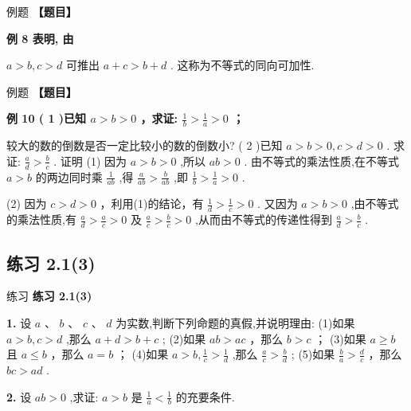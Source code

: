 \documentclass[a4paper,10pt,oneside,fontset=none]{ctexbook}
\renewcommand{\geq}{\geqslant}
\renewcommand{\leq}{\leqslant}
\newcounter{example}[chapter]
\newenvironment{example}[1][]{\begin{exBox}{例题}{#1}}{\end{exBox}}
\newenvironment{exercise}[1][]{\begin{exBox}{练习}{#1}}{\end{exBox}}
\numberwithin{equation}{chapter}
\begin{document}
\begin{example}
\textbf{【题目】}\par\vspace{0.3em}
\textbf{例 8 表明, 由}\par\vspace{0.3em}
$a > b, c > d$
可推出
$a + c > b + d$ .
这称为不等式的同向可加性.
\end{example}

\begin{example}
\textbf{【题目】}\par\vspace{0.3em}
\textbf{例 10 ( 1 )已知 $a > b > 0$ ，求证: $\frac{1}{b} > \frac{1}{a} > 0$ ；}\par\vspace{0.3em}
较大的数的倒数是否一定比较小的数的倒数小?
( 2 )已知 $a > b > 0, c > d > 0$ . 求证: $\frac{a}{d} > \frac{b}{c}$ .
证明 (1) 因为 $a > b > 0$ ,所以 ${ab} > 0$ .
由不等式的乘法性质,在不等式 $a > b$ 的两边同时乘 $\frac{1}{ab}$ ,得 $\frac{a}{ab} > \frac{b}{ab}$ ,即 $\frac{1}{b} > \frac{1}{a} > 0$ .
\par
(2) 因为 $c > d > 0$ ，利用(1)的结论，有 $\frac{1}{d} > \frac{1}{c} > 0$ .
又因为 $a > b > 0$ ,由不等式的乘法性质,有 $\frac{a}{d} > \frac{a}{c} > 0$ 及 $\frac{a}{c} > \frac{b}{c} > 0$ ,从而由不等式的传递性得到 $\frac{a}{d} > \frac{b}{c}$ .
\end{example}

\subsection*{练习 2.1(3)}

\begin{exercise}
\textbf{练习 2.1(3)}\par\vspace{0.5em}
\textbf{1.} 设 $a\text{ 、 }b\text{ 、 }c\text{ 、 }d$ 为实数,判断下列命题的真假,并说明理由: (1)如果 $a > b, c > d$ ,那么 $a + d > b + c$ ; (2)如果 ${ab} > {ac}$ ，那么 $b > c$ ； (3)如果 $a \geq  b$ 且 $a \leq  b$ ，那么 $a = b$ ； (4)如果 $a > b,\frac{1}{c} > \frac{1}{d}$ ,那么 $\frac{a}{c} > \frac{b}{d}$ ; (5)如果 $\frac{b}{a} > \frac{d}{c}$ ，那么 ${bc} > {ad}$ .
\par\vspace{0.8em}
\textbf{2.} 设 ${ab} > 0$ ,求证: $a > b$ 是 $\frac{1}{a} < \frac{1}{b}$ 的充要条件.
\end{exercise}
\end{document}
